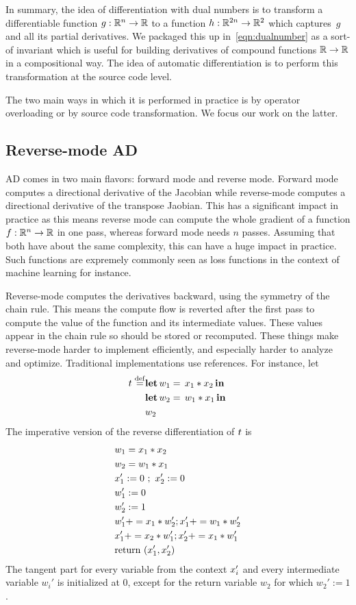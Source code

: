 In summary, the idea of differentiation with dual numbers is 
to transform a differentiable function
$g:\mathbb{R}^n\to \mathbb{R}$ to a function $h:\mathbb{R}^{2n}\to \mathbb{R}^2$ which captures~$g$ and all its partial derivatives. We packaged this up in~\eqref{eqn:dualnumber} as a sort-of invariant which is useful for building derivatives of compound functions $\mathbb{R}\to\mathbb{R}$ in a compositional way.
The idea of automatic differentiation is to perform this transformation at the source code level. 

The two main ways in which it is performed in practice is by operator overloading \cite{} or by source code transformation. We focus our work on the latter.

\subsection{Reverse-mode AD}

AD comes in two main flavors: forward mode and reverse mode. 
Forward mode computes a directional derivative of the Jacobian while reverse-mode computes a directional derivative of the transpose Jaobian. 
This has a significant impact in practice as this means reverse mode can compute the whole gradient of a function $f:\mathbb{R}^n\to \mathbb{R}$ in one pass, whereas forward mode needs $n$ passes. 
Assuming that both have about the same complexity, this can have a huge impact in practice. 
Such functions are expremely commonly seen as loss functions in the context of machine learning for instance.

Reverse-mode computes the derivatives backward, using the symmetry of the chain rule.
This means the compute flow is reverted after the first pass to compute the value of the function and its intermediate values. 
These values appear in the chain rule so should be stored or recomputed.
These things make reverse-mode harder to implement efficiently, and especially harder to analyze and optimize. 
Traditional implementations use references.
For instance, let 
 \begin{align*}
     \trm\defeq &\letin{w_1}{\var_1 * \var_2}{\\&\letin{w_2}{w_1 * \var_1}{\\&w_2}}
 \end{align*}
 The imperative version of the reverse differentiation of $\trm$ is
	\begin{align*}
		&w_1=\var_1 * \var_2 \\
		&w_2=w_1 * \var_1 \\
        &\var_1':=0~;~\var_2':=0 \\
        &w_1':=0 \\
		&w_2':=1 \\
		&w_1'+= \var_1 * w_2'; \var_1'+= w_1*w_2' \\
		&\var_1'+= \var_2 * w_1'; \var_2'+=\var_1 * w_1'\\
		&\text{return }(\var_1',\var_2')  
	\end{align*}
The tangent part for every variable from the context $\var_i'$ and every intermediate variable $w_i'$ is initialized at $0$, 
except for the return variable $w_2$ for which  $w_2':=1$. 

